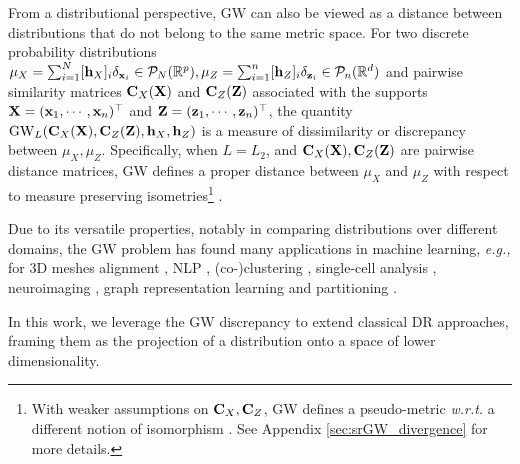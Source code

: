 From a distributional perspective, GW can also be viewed as a distance between distributions that do not belong to the same metric space. For two discrete probability distributions $\mu_X = \sum_{i=1}^N [{\mathbf{h}}_X]_i \delta_{{\mathbf{x}}_i} \in {\mathcal{P}}_N(\mathbb{R}^{p}), \mu_Z =\sum_{i=1}^n [{\mathbf{h}}_Z]_i \delta_{{\mathbf{z}}_i} \in {\mathcal{P}}_n(\mathbb{R}^d)$ and pairwise similarity matrices ${\mathbf{C}}_{X}({\mathbf{X}})$ and ${\mathbf{C}}_{Z}({\mathbf{Z}})$ associated with the supports ${\mathbf{X}} = ({\mathbf{x}}_1, \cdots, {\mathbf{x}}_n)^\top$ and ${\mathbf{Z}} = ({\mathbf{z}}_1, \cdots, {\mathbf{z}}_n)^\top$, the quantity $\operatorname{GW}_L ({\mathbf{C}}_{X}({\mathbf{X}}), {\mathbf{C}}_{Z}({\mathbf{Z}}), {\mathbf{h}}_X, {\mathbf{h}}_Z)$ is a measure of dissimilarity or discrepancy between $\mu_X, \mu_Z$. Specifically, when $L=L_2$, and ${\mathbf{C}}_{X}({\mathbf{X}}), {\mathbf{C}}_{Z}({\mathbf{Z}})$ are pairwise distance matrices, GW defines a proper distance between $\mu_X$ and $\mu_Z$ with respect to measure preserving isometries\footnote{With weaker assumptions on ${\mathbf{C}}_{X}, {\mathbf{C}}_{Z}$, GW defines a pseudo-metric \textit{w.r.t.} a different notion of isomorphism \cite{chowdhury2019gromov}. See Appendix \ref{sec:srGW_divergence} for more details.} \cite{memoli2011gromov}. 

Due to its versatile properties, notably in comparing distributions over different domains,  the GW problem has found many applications in machine learning, \textit{e.g.,} for 3D meshes alignment \cite{solomon2016entropic,ezuz2017gwcnn}, NLP \cite{alvarez2018gromov}, (co-)clustering  \cite{peyre2016gromov, redko2020co}, single-cell analysis \cite{demetci2020gromov}, neuroimaging \cite{thual2022aligning}, graph representation learning \cite{xu2020gromov, vincent2021online, liu2022robust, vincent2022template, pmlr-v202-zeng23c} and partitioning \cite{xu2019scalable, chowdhury2021generalized}.

In this work, we leverage the GW discrepancy to extend classical DR approaches, framing them as the projection of a distribution onto a space of lower dimensionality. 